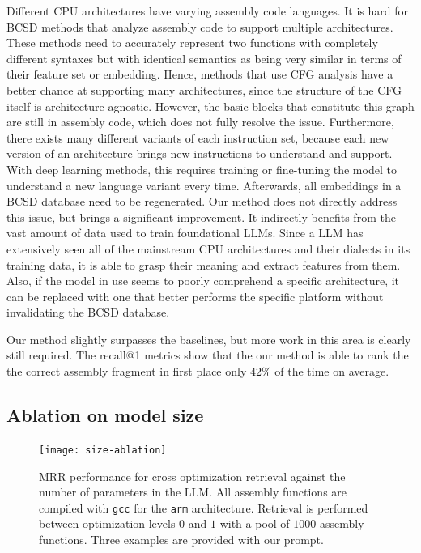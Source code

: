 Different CPU architectures have varying assembly code languages. It is hard for BCSD methods that analyze assembly code to support
multiple architectures. These methods need to accurately represent two functions with completely different syntaxes but with identical
semantics as being very similar in terms of their feature set or embedding. Hence, methods that use CFG analysis have a better chance
at supporting many architectures, since the structure of the CFG itself is architecture agnostic. However, the basic blocks that constitute
this graph are still in assembly code, which does not fully resolve the issue. Furthermore, there exists many different variants of each
instruction set, because each new version of an architecture brings new instructions to understand and support. With deep learning methods,
this requires training or fine-tuning the model to understand a new language variant every time. Afterwards, all embeddings in a BCSD database need to
be regenerated. Our method does not directly address this issue, but brings a significant improvement. It indirectly benefits from the vast
amount of data used to train foundational LLMs. Since a LLM has extensively seen all of the mainstream CPU architectures and their dialects
in its training data, it is able to grasp their meaning and extract features from them. Also, if the model in use seems to poorly comprehend a
specific architecture, it can be replaced with one that better performs the specific platform without invalidating the BCSD database.

Our method slightly surpasses the baselines, but more work in this area is clearly still required. The recall@1 metrics show that the our
method is able to rank the the correct assembly fragment in first place only \(42\%\) of the time on average.

\subsection{Ablation on model size}

\begin{figure}
\centerline{\texttt{[image: size-ablation]}}
\caption{MRR performance for cross optimization retrieval against the number of parameters in the LLM. All assembly functions are compiled
with \texttt{gcc} for the \texttt{arm} architecture. Retrieval is performed between optimization levels \(0\) and \(1\) with a pool of \(1000\) assembly functions.
Three examples are provided with our prompt.}
\label{size-abl}
\end{figure}

